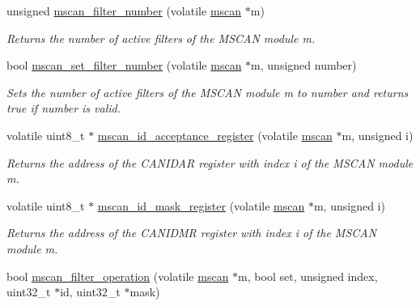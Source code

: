\begin{DoxyCompactItemize}
unsigned \mbox{\hyperlink{group__RTEMSBSPsPowerPCGen5200MSCAN_gae319b1e5e7cf1062871cf930633ccf0c}{mscan\+\_\+filter\+\_\+number}} (volatile \mbox{\hyperlink{group__RTEMSBSPsPowerPCGen5200MSCAN_gacfd56a4a482c5e7da2cff003284b2d51}{mscan}} $\ast$m)
\begin{DoxyCompactList}\small\item\em Returns the number of active filters of the M\+S\+C\+AN module {\itshape m}. \end{DoxyCompactList}\item 
bool \mbox{\hyperlink{group__RTEMSBSPsPowerPCGen5200MSCAN_gab1e2410b46710969d0b6c886e1eb4eb4}{mscan\+\_\+set\+\_\+filter\+\_\+number}} (volatile \mbox{\hyperlink{group__RTEMSBSPsPowerPCGen5200MSCAN_gacfd56a4a482c5e7da2cff003284b2d51}{mscan}} $\ast$m, unsigned number)
\begin{DoxyCompactList}\small\item\em Sets the number of active filters of the M\+S\+C\+AN module {\itshape m} to {\itshape number} and returns true if {\itshape number} is valid. \end{DoxyCompactList}\item 
volatile uint8\+\_\+t $\ast$ \mbox{\hyperlink{group__RTEMSBSPsPowerPCGen5200MSCAN_gadfc7768cf5d070c658a72c4c4a52ec48}{mscan\+\_\+id\+\_\+acceptance\+\_\+register}} (volatile \mbox{\hyperlink{group__RTEMSBSPsPowerPCGen5200MSCAN_gacfd56a4a482c5e7da2cff003284b2d51}{mscan}} $\ast$m, unsigned i)
\begin{DoxyCompactList}\small\item\em Returns the address of the C\+A\+N\+I\+D\+AR register with index {\itshape i} of the M\+S\+C\+AN module {\itshape m}. \end{DoxyCompactList}\item 
volatile uint8\+\_\+t $\ast$ \mbox{\hyperlink{group__RTEMSBSPsPowerPCGen5200MSCAN_ga59f5c272b5395fa083348d087fd4c34e}{mscan\+\_\+id\+\_\+mask\+\_\+register}} (volatile \mbox{\hyperlink{group__RTEMSBSPsPowerPCGen5200MSCAN_gacfd56a4a482c5e7da2cff003284b2d51}{mscan}} $\ast$m, unsigned i)
\begin{DoxyCompactList}\small\item\em Returns the address of the C\+A\+N\+I\+D\+MR register with index {\itshape i} of the M\+S\+C\+AN module {\itshape m}. \end{DoxyCompactList}\item 
bool \mbox{\hyperlink{group__RTEMSBSPsPowerPCGen5200MSCAN_gafae77c5bbc712dd3fe5e7432462e3d08}{mscan\+\_\+filter\+\_\+operation}} (volatile \mbox{\hyperlink{group__RTEMSBSPsPowerPCGen5200MSCAN_gacfd56a4a482c5e7da2cff003284b2d51}{mscan}} $\ast$m, bool set, unsigned index, uint32\+\_\+t $\ast$id, uint32\+\_\+t $\ast$mask)

\end{DoxyCompactItemize}
